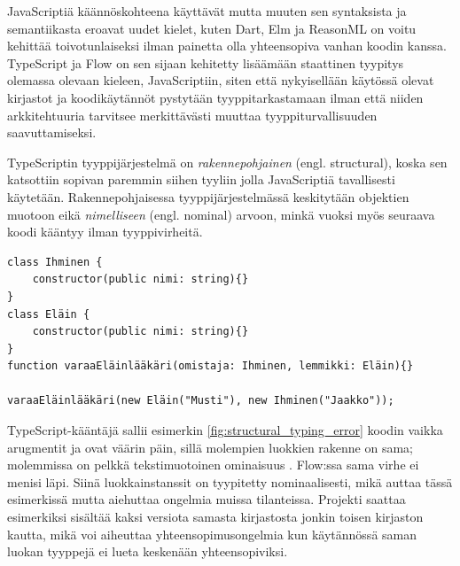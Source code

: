 JavaScriptiä käännöskohteena käyttävät
mutta muuten sen syntaksista ja semantiikasta eroavat uudet kielet,
kuten Dart, Elm ja ReasonML on voitu kehittää toivotunlaiseksi ilman painetta olla
yhteensopiva vanhan koodin kanssa. TypeScript ja Flow on sen sijaan kehitetty
lisäämään staattinen tyypitys olemassa olevaan kieleen, JavaScriptiin,
siten että nykyisellään käytössä olevat kirjastot ja koodikäytännöt pystytään
tyyppitarkastamaan ilman että niiden arkkitehtuuria tarvitsee merkittävästi
muuttaa tyyppiturvallisuuden saavuttamiseksi.

TypeScriptin tyyppijärjestelmä on \textit{rakennepohjainen} (engl. structural),
koska sen katsottiin sopivan paremmin siihen tyyliin jolla JavaScriptiä tavallisesti
käytetään. Rakennepohjaisessa tyyppijärjestelmässä keskitytään objektien muotoon
eikä \textit{nimelliseen} (engl. nominal) arvoon, minkä vuoksi myös seuraava koodi kääntyy
ilman tyyppivirheitä.

\begin{lstlisting}[caption={
  Loogisen virheen sisältävä, mutta ilman varoituksia kääntyvä TypeScript-ohjelma.
}, label={fig:structural_typing_error}]
class Ihminen {
    constructor(public nimi: string){}
}
class Eläin {
    constructor(public nimi: string){}
}
function varaaEläinlääkäri(omistaja: Ihminen, lemmikki: Eläin){}

varaaEläinlääkäri(new Eläin("Musti"), new Ihminen("Jaakko"));
\end{lstlisting}
TypeScript-kääntäjä sallii esimerkin \ref{fig:structural_typing_error} koodin
vaikka arugmentit \mbox{} ja \newline\mbox{}
ovat väärin päin, sillä molempien luokkien rakenne on sama; molemmissa on
pelkkä tekstimuotoinen ominaisuus . Flow:ssa sama virhe ei menisi läpi.
Siinä luokkainstanssit on tyypitetty nominaalisesti, mikä auttaa tässä
esimerkissä mutta aiehuttaa ongelmia muissa tilanteissa. Projekti saattaa
esimerkiksi sisältää kaksi versiota samasta kirjastosta jonkin toisen
kirjaston kautta, mikä voi aiheuttaa yhteensopimusongelmia kun käytännössä
saman luokan tyyppejä ei lueta keskenään yhteensopiviksi.